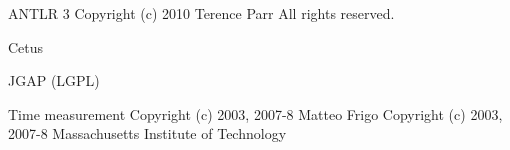 ANTLR 3
Copyright (c) 2010 Terence Parr
All rights reserved.

Cetus


JGAP
(LGPL)


Time measurement
Copyright (c) 2003, 2007-8 Matteo Frigo
Copyright (c) 2003, 2007-8 Massachusetts Institute of Technology

